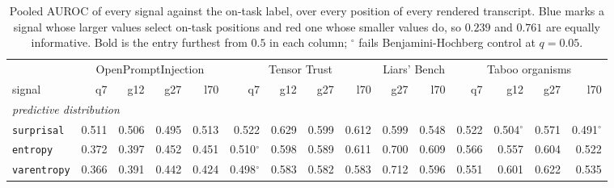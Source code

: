 \begin{table}[t]
\centering
\scriptsize
\setlength{\tabcolsep}{2.2pt}
\renewcommand{\arraystretch}{1.15}
\caption{Pooled AUROC of every signal against the on-task label, over every position of every rendered transcript. Blue marks a signal whose larger values select on-task positions and red one whose smaller values do, so $0.239$ and $0.761$ are equally informative. Bold is the entry furthest from $0.5$ in each column; $^{\circ}$ fails Benjamini-Hochberg control at $q=0.05$.}
\label{tab:signal-auroc}
\begin{tabular}{@{}lrrrrrrrrrrrrrr@{}}
\toprule
 & \multicolumn{4}{c}{OpenPromptInjection} & \multicolumn{4}{c}{Tensor Trust} & \multicolumn{2}{c}{Liars' Bench} & \multicolumn{4}{c}{Taboo organisms} \\
\cmidrule(lr){2-5}\cmidrule(lr){6-9}\cmidrule(lr){10-11}\cmidrule(lr){12-15}
signal & q7 & g12 & g27 & l70 & q7 & g12 & g27 & l70 & g27 & l70 & q7 & g12 & g27 & l70 \\
\midrule
\multicolumn{15}{l}{\emph{predictive distribution}} \\
\texttt{surprisal} & \cellcolor[HTML]{EBECEC}0.511 & \cellcolor[HTML]{EEEEEC}0.506 & \cellcolor[HTML]{F0EDEA}0.495 & \cellcolor[HTML]{EAEBEC}0.513 & \cellcolor[HTML]{E6E9EC}0.522 & \cellcolor[HTML]{B7CDE8}0.629 & \cellcolor[HTML]{C5D5EA}0.599 & \cellcolor[HTML]{BFD1E9}0.612 & \cellcolor[HTML]{C5D5EA}0.599 & \cellcolor[HTML]{DBE2EB}0.548 & \cellcolor[HTML]{E6E9EC}0.522 & \cellcolor[HTML]{EEEEEC}0.504$^{\circ}$ & \cellcolor[HTML]{D1DCEA}0.571 & \cellcolor[HTML]{F0ECE8}0.491$^{\circ}$ \\
\texttt{entropy} & \cellcolor[HTML]{F3C2BB}0.372 & \cellcolor[HTML]{F3CBC5}0.397 & \cellcolor[HTML]{F2DED9}0.452 & \cellcolor[HTML]{F2DED9}0.451 & \cellcolor[HTML]{ECECEC}0.510$^{\circ}$ & \cellcolor[HTML]{C5D5EA}0.598 & \cellcolor[HTML]{C9D8EA}0.589 & \cellcolor[HTML]{BFD2E9}0.611 & \cellcolor[HTML]{98BAE5}0.700 & \cellcolor[HTML]{C0D2E9}0.609 & \cellcolor[HTML]{D3DEEB}0.566 & \cellcolor[HTML]{D7E0EB}0.557 & \cellcolor[HTML]{C2D4E9}0.604 & \cellcolor[HTML]{E6E9EC}0.522 \\
\texttt{varentropy} & \cellcolor[HTML]{F3C0B9}0.366 & \cellcolor[HTML]{F3C9C2}0.391 & \cellcolor[HTML]{F2DBD6}0.442 & \cellcolor[HTML]{F3D4CF}0.424 & \cellcolor[HTML]{F0EEEB}0.498$^{\circ}$ & \cellcolor[HTML]{CBD9EA}0.583 & \cellcolor[HTML]{CCDAEA}0.582 & \cellcolor[HTML]{CCD9EA}0.583 & \cellcolor[HTML]{93B7E5}0.712 & \cellcolor[HTML]{C6D6EA}0.596 & \cellcolor[HTML]{D9E1EB}0.551 & \cellcolor[HTML]{C4D4E9}0.601 & \cellcolor[HTML]{BACFE9}0.622 & \cellcolor[HTML]{E1E6EB}0.535 \\

\end{tabular}
\end{table}
